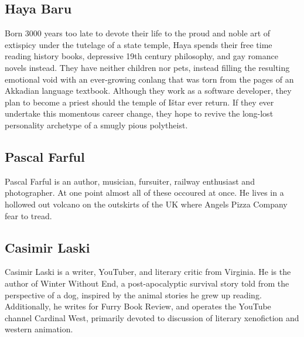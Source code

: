 \subsection*{Haya Baru}
Born 3000 years too late to devote their life to the proud and noble art of extispicy under the tutelage of a state temple, Haya spends their free time reading history books, depressive 19th century philosophy, and gay romance novels instead. They have neither children nor pets, instead filling the resulting emotional void with an ever-growing conlang that was torn from the pages of an Akkadian language textbook. Although they work as a software developer, they plan to become a priest should the temple of Ištar ever return. If they ever undertake this momentous career change, they hope to revive the long-lost personality archetype of a smugly pious polytheist.

\subsection*{Pascal Farful}
Pascal Farful is an author, musician, fursuiter, railway enthusiast and photographer. At one point almost all of these occoured at once. He lives in a hollowed out volcano on the outskirts of the UK where Angels Pizza Company fear to tread.

\subsection*{Casimir Laski}
Casimir Laski is a writer, YouTuber, and literary critic from Virginia. He is the author of Winter Without End, a post-apocalyptic survival story told from the perspective of a dog, inspired by the animal stories he grew up reading. Additionally, he writes for Furry Book Review, and operates the YouTube channel Cardinal West, primarily devoted to discussion of literary xenofiction and western animation.
